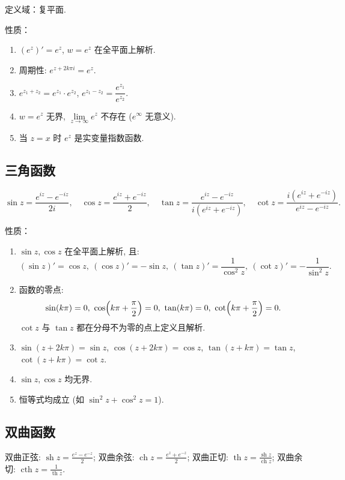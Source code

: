 \documentclass[theorem=false,mathfont=none,openany,sub3section]{easybook}
\begin{document}
定义域：复平面.

性质：
\begin{enumerate}
  \item $(e^{z})'=e^{z}$, $w=e^{z}$ 在全平面上解析.
  \item 周期性: $e^{z+2k\pi i}=e^{z}$.
  \item $e^{z_{1}+z_{2}}=e^{z_{1}}\cdot e^{z_{2}}$, $e^{z_{1}-z_{2}}=\dfrac{e^{z_{1}}}{e^{z_{2}}}$.
  \item $w=e^{z}$ 无界, $\lim\limits_{z\to\infty}e^{z}$ 不存在 ($e^{\infty}$ 无意义).
  \item 当 $z=x$ 时 $e^{z}$ 是实变量指数函数.
\end{enumerate}

\subsection{三角函数}

\begin{definition}
  \[
  \sin z=\frac{e^{iz}-e^{-iz}}{2i},\quad
  \cos z=\frac{e^{iz}+e^{-iz}}{2},\quad
  \tan z=\frac{e^{iz}-e^{-iz}}{i(e^{iz}+e^{-iz})},\quad
  \cot z=\frac{i(e^{iz}+e^{-iz})}{e^{iz}-e^{-iz}}.
  \]
\end{definition}

性质：
\begin{enumerate}
  \item $\sin z,\cos z$ 在全平面上解析, 且:
  \[
  (\sin z)'=\cos z,\ (\cos z)'=-\sin z,\ (\tan z)'=\frac{1}{\cos^{2}z},\ (\cot z)'=-\frac{1}{\sin^{2}z}.
  \]
  \item 函数的零点:
  \[
  \sin(k\pi)=0,\ \cos\Bigl(k\pi+\frac{\pi}{2}\Bigr)=0,\ \tan(k\pi)=0,\ \cot\Bigl(k\pi+\frac{\pi}{2}\Bigr)=0.
  \]
  $\cot z$ 与 $\tan z$ 都在分母不为零的点上定义且解析.
  \item $\sin(z+2k\pi)=\sin z$, $\cos(z+2k\pi)=\cos z$,
  $\tan(z+k\pi)=\tan z$, $\cot(z+k\pi)=\cot z$.
  \item $\sin z,\cos z$ 均无界.
  \item 恒等式均成立 (如 $\sin^{2}z+\cos^{2}z=1$).
\end{enumerate}

\subsection{双曲函数}

\begin{definition}
  双曲正弦: $\operatorname{sh}z=\frac{e^{z}-e^{-z}}{2}$;\quad
  双曲余弦: $\operatorname{ch}z=\frac{e^{z}+e^{-z}}{2}$;\quad
  双曲正切: $\operatorname{th}z=\frac{\operatorname{sh}z}{\operatorname{ch}z}$;\quad
  双曲余切: $\operatorname{cth}z=\frac{1}{\operatorname{th}z}$.
\end{definition}
\end{document}
